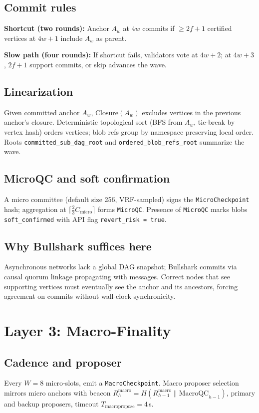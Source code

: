\documentclass[11pt,a4paper,twoside]{report}
\theoremstyle{definition}
\begin{document}
\section{Commit rules}
\textbf{Shortcut (two rounds):} Anchor $A_w$ at $4w$ commits if $\geq 2f{+}1$ certified vertices at $4w{+}1$ include $A_w$ as parent.

\textbf{Slow path (four rounds):} If shortcut fails, validators vote at $4w{+}2$; at $4w{+}3$, $2f{+}1$ support commits, or skip advances the wave.

\section{Linearization}
Given committed anchor $A_w$, $\mathrm{Closure}(A_w)$ excludes vertices in the previous anchor's closure. Deterministic topological sort (BFS from $A_w$, tie-break by vertex hash) orders vertices; blob refs group by namespace preserving local order. Roots \texttt{committed\_sub\_dag\_root} and \texttt{ordered\_blob\_refs\_root} summarize the wave.

\section{MicroQC and soft confirmation}
A micro committee (default size 256, VRF-sampled) signs the \texttt{MicroCheckpoint} hash; aggregation at $\lceil \frac{2}{3} C_{\mathrm{micro}} \rceil$ forms \texttt{MicroQC}. Presence of \texttt{MicroQC} marks blobs \texttt{soft\_confirmed} with API flag \texttt{revert\_risk = true}.

\section{Why Bullshark suffices here}
Asynchronous networks lack a global DAG snapshot; Bullshark commits via causal quorum linkage propagating with messages. Correct nodes that see supporting vertices must eventually see the anchor and its ancestors, forcing agreement on commits without wall-clock synchronicity.

\chapter{Layer 3: Macro-Finality}
\label{ch:macro}

\section{Cadence and proposer}
Every $W=8$ micro-slots, emit a \texttt{MacroCheckpoint}. Macro proposer selection mirrors micro anchors with beacon $R^{\mathrm{macro}}_h = H(R^{\mathrm{macro}}_{h-1} \| \mathrm{MacroQC}_{h-1})$, primary and backup proposers, timeout $T_{\mathrm{macropropose}} = 4$\,s.
\end{document}
